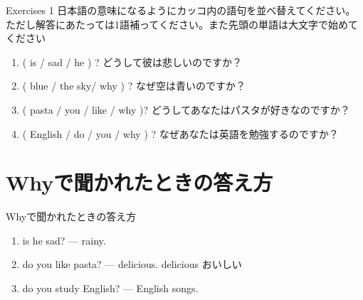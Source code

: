 \documentclass[aspectratio=169,xcolor={dvipsnames,table}]{beamer}
\begin{document}
\begin{frame}[plain]{Exercises 1}
日本語の意味になるようにカッコ内の語句を並べ替えてください。ただし解答にあたっては1語補ってください。また先頭の単語は大文字で始めてください
 \begin{enumerate}
  \item ( is / sad / he ) ? どうして彼は悲しいのですか？\\
  \item ( blue / the sky/ why ) ? なぜ空は青いのですか？\\
  \item ( pasta / you / like / why )? どうしてあなたはパスタが好きなのですか？\\
  \item ( English / do / you / why ) ? なぜあなたは英語を勉強するのですか？\\
 \end{enumerate}

\hfill{}
\end{frame}
\section{Whyで聞かれたときの答え方}
\begin{frame}[plain]{Whyで聞かれたときの答え方}
 \begin{enumerate}
  \item {} is he sad? ---   rainy.
  \item {} do you like pasta? ---   delicious.%
\hfill{\scriptsize delicious  おいしい}
  \item {} do you study English? ---   English songs.
 \end{enumerate}


\hfill{\scriptsize {}}
\end{frame}
\end{document}
